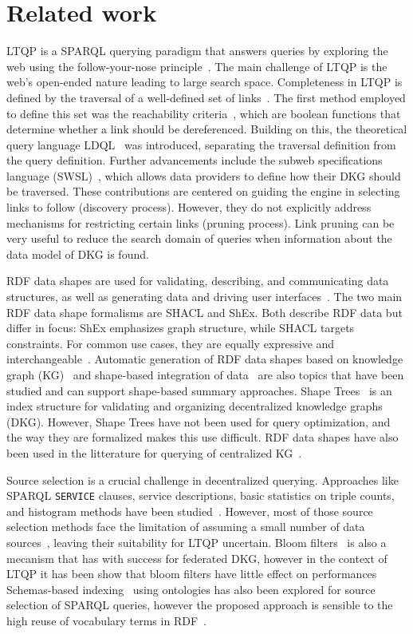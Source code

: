 \section{Related work}

LTQP is a SPARQL querying paradigm that answers queries by exploring the web using the follow-your-nose principle~\cite{hartig2016walking}.
The main challenge of LTQP is the web's open-ended nature leading to large search space.
Completeness in LTQP is defined by the traversal of a well-defined set of links~\cite{Hartig2012}.
The first method employed to define this set was the reachability criteria~\cite{Hartig2012}, which are boolean functions that determine whether a link should be dereferenced.
Building on this, the theoretical query language LDQL~\cite{hartigLDQL} was introduced, separating the traversal definition from the query definition.
Further advancements include the subweb specifications language (SWSL)~\cite{Bogaerts2021LinkTW}, which allows data providers to define how their DKG should be traversed.
These contributions are centered on guiding the engine in selecting links to follow (discovery process).
However, they do not explicitly address mechanisms for restricting certain links (pruning process).
Link pruning can be very useful to reduce the search domain of queries when information about the data model of DKG is found.

RDF data shapes are used for validating, describing, and communicating data structures, as well as generating data and driving user interfaces~\cite{Gayo2018a,Gayo2018}.
The two main RDF data shape formalisms are SHACL and ShEx.
Both describe RDF data but differ in focus: ShEx emphasizes graph structure, while SHACL targets constraints.
For common use cases, they are equally expressive and interchangeable~\cite{Gayo2018c}.
Automatic generation of RDF data shapes based on knowledge graph (KG)~\cite{fernandez2023extracting} and shape-based integration of data~\cite{LabraGayo2023} are also topics that have been studied and can support shape-based summary approaches.
Shape Trees~\cite{shapetreesShapeTrees} is an index structure for validating and organizing decentralized knowledge graphs (DKG).
However, Shape Trees have not been used for query optimization, and the way they are formalized makes this use difficult.
RDF data shapes have also been used in the litterature for querying of centralized KG~\cite{kashif2021}.

Source selection is a crucial challenge in decentralized querying.
Approaches like SPARQL \texttt{SERVICE} clauses, service descriptions, basic statistics on triple counts, and histogram methods have been studied~\cite{hose2012towards, Harth2010}.
However, most of those source selection methods face the limitation of assuming a small number of data sources~\cite{Harth2010}, leaving their suitability for LTQP uncertain.
Bloom filters~\cite{dia2018fast} is also a mecanism that has with success for federated DKG, however in the context of LTQP it has been show that bloom filters have little effect on performances~\cite{Hanski2024}
Schemas-based indexing~\cite{Stuckenschmidt2004} using ontologies has also been explored for source selection of SPARQL queries,
however the proposed approach is sensible to the high reuse of vocabulary terms in RDF~\cite{Harth2010}.